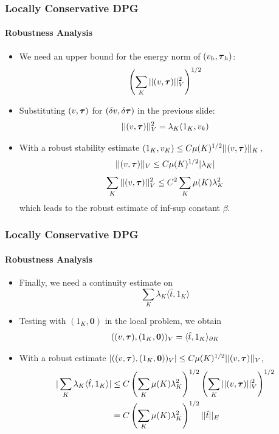 \documentclass[18pt,xcolor=table]{beamer}
\begin{document}
\begin{frame}[noframenumbering]
\frametitle{Locally Conservative DPG}
\framesubtitle{Robustness Analysis}
\begin{itemize}
    \item We need an upper bound for the energy norm of $(v_h,\boldsymbol\tau_h)$:
      \[
      \left( \sum_K||(v,\boldsymbol\tau)||^2_V \right)^{1/2}
      \]
    \item Substituting $(v,\boldsymbol\tau)$ for $(\delta v,\delta\boldsymbol\tau)$ in the
      previous slide:
      \[
      ||(v,\boldsymbol\tau)||^2_V=\lambda_K(1_K,v_k)
      \]
    \item With a robust stability estimate
      $
      (1_K,v_K)\leq C\mu(K)^{1/2}||(v,\boldsymbol\tau)||_K\,,
      $
      \[
      ||(v,\boldsymbol\tau)||_V\leq C\mu(K)^{1/2}|\lambda_K|
      \]
      \[
      \sum_K||(v,\boldsymbol\tau)||_V^2\leq C^2\sum_K\mu(K)\lambda_K^2
      \]
      which leads to the robust estimate of inf-sup constant $\beta$.
\end{itemize}
\end{frame}

\begin{frame}[noframenumbering]
\frametitle{Locally Conservative DPG}
\framesubtitle{Robustness Analysis}
\begin{itemize}
    \item Finally, we need a continuity estimate on
      \[
      \sum_K\lambda_K\langle\hat t,1_K\rangle
      \]
    \item Testing with $(1_K,\boldsymbol0)$ in the local problem, we obtain
      \[
      ( (v,\boldsymbol\tau),(1_K,\boldsymbol0) )_V=\langle\hat t,1_K\rangle_{\partial K}
      \]
    \item With a robust estimate $|( (v,\boldsymbol\tau),(1_K,\boldsymbol0) )_V|\leq
      C\mu(K)^{1/2}||(v,\boldsymbol\tau)||_V$,
      \begin{align*}
        |\sum_K\lambda_K\langle\hat t,1_K\rangle|
        &\leq C\left( \sum_K\mu(K)\lambda_K^2 \right)^{1/2}\left( \sum_K||(v,\boldsymbol\tau)||_V^2 \right)^{1/2}\\
        &=C\left( \sum_K\mu(K)\lambda_K^2 \right)^{1/2}||\hat t||_E
      \end{align*}
\end{itemize}
\end{frame}

\end{document}

